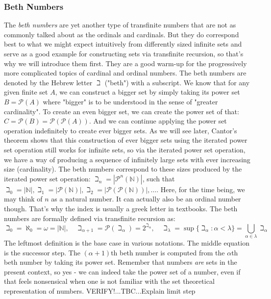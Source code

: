 \subsubsection{Beth Numbers}
The \emph{beth numbers} are yet another type of transfinite numbers that are not as commonly talked about as the ordinals and cardinals. But they do correspond best to what we might expect intuitively from differently sized infinite sets and serve as a good example for constructing sets via transfinite recursion, so that's why we will introduce them first. They are a good warm-up for the progressively more complicated topics of cardinal and ordinal numbers. The beth numbers are denoted by the Hebrew letter $\beth$ ("beth") with a subscript. We know that for any given finite set $A$, we can construct a bigger set by simply taking its power set $B = \mathcal{P}(A)$ where "bigger" is to be understood in the sense of "greater cardinality". To create an even bigger set, we can create the power set of that: $C = \mathcal{P}(B) = \mathcal{P}(\mathcal{P}(A))$. And we can continue applying the power set operation indefinitely to create ever bigger sets. As we will see later, Cantor's theorem shows that this construction of ever bigger sets using the iterated power set operation still works for infinite sets, so via the iterated power set operation, we have a way of producing a sequence of infinitely large sets with ever increasing size (cardinality). The beth numbers correspond to these sizes produced by the iterated power set operation: $\beth_n = |\mathcal{P}^n (\mathbb{N})|$, such that $\beth_0 = |\mathbb{N}|, \beth_1 = |\mathcal{P} (\mathbb{N})|, \beth_2 = |\mathcal{P}(\mathcal{P} (\mathbb{N}))|, \ldots$. Here, for the time being, we may think of $n$ as a natural number. It can actually also be an ordinal number though. That's why the index is usually a greek letter in textbooks. The beth numbers are formally defined via transfinite recursion as:
\begin{equation}
\beth_0 = \aleph_0 
        = \omega 
        = |\mathbb{N}|, \quad
\beth_{\alpha + 1} = \mathcal{P}(\beth_{\alpha}) 
                   = 2^{\beth_{\alpha}}, \quad
\beth_{\lambda} = \sup \{ \beth_{\alpha} : \alpha < \lambda \} 
                = \bigcup_{\alpha \in \lambda} \beth_{\alpha} 
\end{equation}
The leftmost definition is the base case in various notations. The middle equation is the successor step. The $(\alpha+1)$th beth number is computed from the $\alpha$th beth number by taking its power set. Remember that numbers \emph{are} sets in the present context, so yes - we can indeed take the power set of a number, even if that feels nonsensical when one is not familiar with the set theoretical representation of numbers. VERIFY!...TBC...Explain limit step

